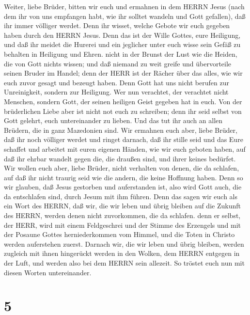  Weiter, liebe Brüder, bitten wir euch und ermahnen in dem
HERRN Jesus (nach dem ihr von uns empfangen habt, wie ihr solltet
wandeln und Gott gefallen), daß ihr immer völliger werdet. 
Denn ihr wisset, welche Gebote wir euch gegeben haben durch den HERRN
Jesus.  Denn das ist der Wille Gottes, eure Heiligung, und
daß ihr meidet die Hurerei  und ein jeglicher unter euch
wisse sein Gefäß zu behalten in Heiligung und Ehren.  nicht
in der Brunst der Lust wie die Heiden, die von Gott nichts wissen;
 und daß niemand zu weit greife und übervorteile seinen
Bruder im Handel; denn der HERR ist der Rächer über das alles, wie wir
euch zuvor gesagt und bezeugt haben.  Denn Gott hat uns
nicht berufen zur Unreinigkeit, sondern zur Heiligung.  Wer
nun verachtet, der verachtet nicht Menschen, sondern Gott, der seinen
heiligen Geist gegeben hat in euch.  Von der brüderlichen
Liebe aber ist nicht not euch zu schreiben; denn ihr seid selbst von
Gott gelehrt, euch untereinander zu lieben.  Und das tut
ihr auch an allen Brüdern, die in ganz Mazedonien sind. Wir ermahnen
euch aber, liebe Brüder, daß ihr noch völliger werdet  und
ringet darnach, daß ihr stille seid und das Eure schaffet und arbeitet
mit euren eigenen Händen, wie wir euch geboten haben,  auf
daß ihr ehrbar wandelt gegen die, die draußen sind, und ihrer keines
bedürfet.  Wir wollen euch aber, liebe Brüder, nicht
verhalten von denen, die da schlafen, auf daß ihr nicht traurig seid wie
die andern, die keine Hoffnung haben.  Denn so wir glauben,
daß Jesus gestorben und auferstanden ist, also wird Gott auch, die da
entschlafen sind, durch Jesum mit ihm führen.  Denn das
sagen wir euch als ein Wort des HERRN, daß wir, die wir leben und übrig
bleiben auf die Zukunft des HERRN, werden denen nicht zuvorkommen, die
da schlafen.  denn er selbst, der HERR, wird mit einem
Feldgeschrei und der Stimme des Erzengels und mit der Posaune Gottes
herniederkommen vom Himmel, und die Toten in Christo werden auferstehen
zuerst.  Darnach wir, die wir leben und übrig bleiben,
werden zugleich mit ihnen hingerückt werden in den Wolken, dem HERRN
entgegen in der Luft, und werden also bei dem HERRN sein allezeit.
 So tröstet euch nun mit diesen Worten untereinander.

\hypertarget{section-4}{%
\section{5}\label{section-4}}

